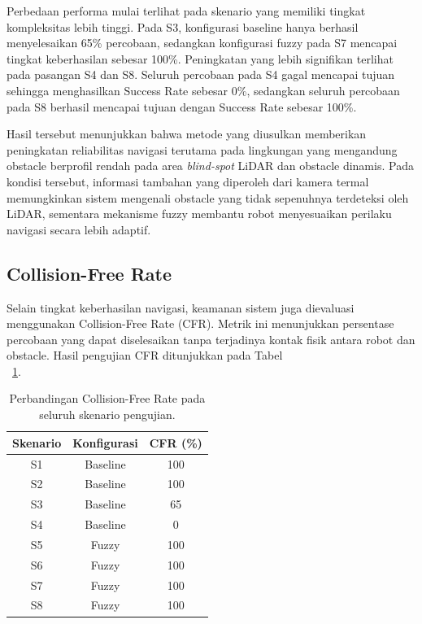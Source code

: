 Perbedaan performa mulai terlihat pada skenario yang memiliki tingkat kompleksitas lebih tinggi. Pada S3, konfigurasi baseline hanya berhasil menyelesaikan 65\% percobaan, sedangkan konfigurasi fuzzy pada S7 mencapai tingkat keberhasilan sebesar 100\%. Peningkatan yang lebih signifikan terlihat pada pasangan S4 dan S8. Seluruh percobaan pada S4 gagal mencapai tujuan sehingga menghasilkan Success Rate sebesar 0\%, sedangkan seluruh percobaan pada S8 berhasil mencapai tujuan dengan Success Rate sebesar 100\%.

Hasil tersebut menunjukkan bahwa metode yang diusulkan memberikan peningkatan reliabilitas navigasi terutama pada lingkungan yang mengandung obstacle berprofil rendah pada area \textit{blind-spot} LiDAR dan obstacle dinamis. Pada kondisi tersebut, informasi tambahan yang diperoleh dari kamera termal memungkinkan sistem mengenali obstacle yang tidak sepenuhnya terdeteksi oleh LiDAR, sementara mekanisme fuzzy membantu robot menyesuaikan perilaku navigasi secara lebih adaptif.

\subsection{Collision-Free Rate}

Selain tingkat keberhasilan navigasi, keamanan sistem juga dievaluasi menggunakan Coll\-ision-Free Rate (CFR). Metrik ini menunjukkan persentase percobaan yang dapat diselesaikan tanpa terjadinya kontak fisik antara robot dan obstacle. Hasil pengujian CFR ditunjukkan pada Tabel\\~\ref{tab:cfr}.

\begin{table}[H]
\centering
\caption{Perbandingan Collision-Free Rate pada seluruh skenario pengujian.}
\label{tab:cfr}
\begin{tabular}{ccc}
\toprule
Skenario & Konfigurasi & CFR (\%) \\
\midrule
S1 & Baseline & 100 \\
S2 & Baseline & 100 \\
S3 & Baseline & 65 \\
S4 & Baseline & 0 \\
S5 & Fuzzy & 100 \\
S6 & Fuzzy & 100 \\
S7 & Fuzzy & 100 \\
S8 & Fuzzy & 100 \\
\bottomrule
\end{tabular}
\end{table}

